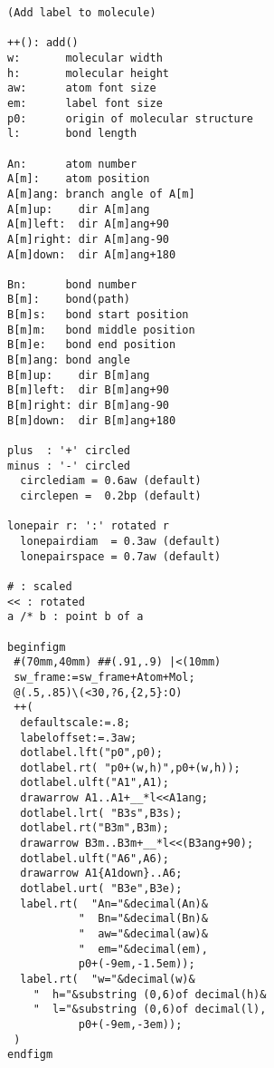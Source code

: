 \documentclass[a4paper]{article}
\begin{document}
\begin{verbatim}
(Add label to molecule)

++(): add()
w:       molecular width
h:       molecular height
aw:      atom font size
em:      label font size
p0:      origin of molecular structure
l:       bond length

An:      atom number
A[m]:    atom position
A[m]ang: branch angle of A[m]
A[m]up:    dir A[m]ang
A[m]left:  dir A[m]ang+90
A[m]right: dir A[m]ang-90
A[m]down:  dir A[m]ang+180

Bn:      bond number
B[m]:    bond(path)
B[m]s:   bond start position
B[m]m:   bond middle position
B[m]e:   bond end position
B[m]ang: bond angle
B[m]up:    dir B[m]ang
B[m]left:  dir B[m]ang+90
B[m]right: dir B[m]ang-90
B[m]down:  dir B[m]ang+180

plus  : '+' circled
minus : '-' circled
  circlediam = 0.6aw (default)
  circlepen =  0.2bp (default)

lonepair r: ':' rotated r
  lonepairdiam  = 0.3aw (default)
  lonepairspace = 0.7aw (default)

# : scaled
<< : rotated
a /* b : point b of a

beginfigm
 #(70mm,40mm) ##(.91,.9) |<(10mm)
 sw_frame:=sw_frame+Atom+Mol;
 @(.5,.85)\(<30,?6,{2,5}:O)
 ++(
  defaultscale:=.8;
  labeloffset:=.3aw;
  dotlabel.lft("p0",p0);
  dotlabel.rt( "p0+(w,h)",p0+(w,h));
  dotlabel.ulft("A1",A1);
  drawarrow A1..A1+__*l<<A1ang;
  dotlabel.lrt( "B3s",B3s);
  dotlabel.rt("B3m",B3m);
  drawarrow B3m..B3m+__*l<<(B3ang+90);
  dotlabel.ulft("A6",A6);
  drawarrow A1{A1down}..A6;
  dotlabel.urt( "B3e",B3e);
  label.rt(  "An="&decimal(An)&
           "  Bn="&decimal(Bn)&
           "  aw="&decimal(aw)&
           "  em="&decimal(em),
           p0+(-9em,-1.5em));
  label.rt(  "w="&decimal(w)&
    "  h="&substring (0,6)of decimal(h)&
    "  l="&substring (0,6)of decimal(l),
           p0+(-9em,-3em));
 )
endfigm
\end{verbatim}
\end{document}
